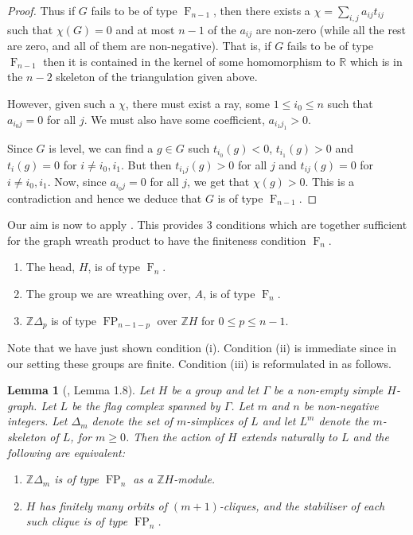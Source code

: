 \documentclass[11pt,a4paper]{amsart}
\newtheorem{lemma}[theorem]{Lemma}
\theoremstyle{definition}
\theoremstyle{remark}
\newcommand{\Z}{\mathbb Z}
\newcommand{\R}{\mathbb R}
\newcommand{\FFF}{\operatorname{F}}
\newcommand{\FP}{\operatorname{FP}}
\begin{document}
\begin{proof}
Thus if $G$ fails to be of type $\FFF_{n-1}$, then there exists a $\chi = \sum_{i,j} a_{ij} t_{ij}$ such that $\chi(G) = 0$ and at most  $n-1$ of the $a_{ij}$ are non-zero (while all the rest are zero, and all of them are non-negative). That is, if $G$ fails to be of type $\FFF_{n-1}$ then it is contained in the kernel of some homomorphism to $\R$ which is in the $n-2$ skeleton of the triangulation given above. 


However, given such a $\chi$, there must exist a ray, some $1 \leq i_0 \leq n$ such that $a_{i_0 j} = 0 $ for all $j$. We must also have some coefficient, $a_{i_1 j_1} > 0$. 


Since $G$ is level, we can find a $g \in G$ such  $t_{i_0}(g) < 0$, $t_{i_1}(g) > 0$ and $t_i(g) = 0 $ for $i \neq i_0, i_1$. But then $t_{i_1 j}(g) > 0 $ for all $j$ and $t_{ij}(g) = 0$ for $i \neq i_0, i_1$. Now, since $a_{i_0 j} = 0 $ for all $j$, we get that $\chi(g) > 0$. This is a contradiction and hence we deduce that $G$ is of type $\FFF_{n-1}$. 
\end{proof}
Our aim is now to apply \cite[Theorem A]{KM1}. This provides 3 conditions which are together sufficient for the graph wreath product to have the finiteness condition $\FFF_n$.
\begin{enumerate}
\item The head, $H$, is of type $\FFF_n$.
\item The group we are wreathing over, $A$, is of type $\FFF_n$.
\item $\Z\Delta_p$ is of type $\FP_{n-1-p}$ over $\Z H$ for $0\le p\le n-1$.
\end{enumerate}
Note that we have just shown condition (i). Condition (ii) is immediate since in our setting these groups are finite. Condition (iii) is reformulated in \cite[Lemma 1.8]{KM1} as follows.
\begin{lemma}[\cite{KM1}, Lemma 1.8] \label{graphwreathresult}
Let $H$ be a group and let $\Gamma$ be a non-empty simple $H$-graph. Let $L$ be the flag complex spanned by $\Gamma$. Let $m$ and $n$ be non-negative integers. Let $\Delta_m$ denote the set of $m$-simplices of $L$ and let $L^m$ denote the $m$-skeleton of $L$, for $m \ge 0$. Then the action of $H$ extends naturally to $L$ and the following are equivalent:
\begin{enumerate}
\item $\Z\Delta_m$ is of type $\FP_n$ as a $\Z H$-module.
\item $H$ has finitely many orbits of $(m+1)$-cliques, and the stabiliser of each such clique is of type $\FP_n$.
\end{enumerate}
\end{lemma}
\end{document}
